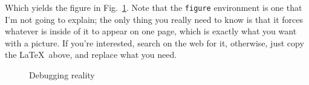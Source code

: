 \documentclass[letterpaper]{article}
\begin{document}
\noindent
Which yields the figure in Fig.~\ref{FlowChart1}.  Note that the \verb+figure+
environment is one that I'm not going to explain; the only thing you
really need to know is that it forces whatever is inside of it to appear on
one page, which is exactly what you want with a picture.  If you're interested,
search on the web for it, otherwise, just copy the \LaTeX\ above, and replace
what you need.

\begin{figure}[htb]
    \centering
    \caption{Debugging reality}
    \label{FlowChart1}
\end{figure}
\end{document}
